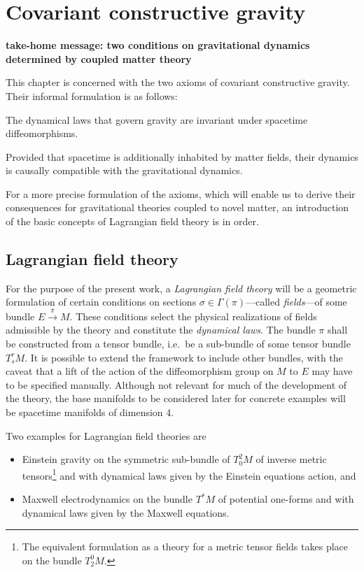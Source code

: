 \chapter{Covariant constructive gravity}

\textbf{take-home message: two conditions on gravitational dynamics determined by coupled matter theory}

This chapter is concerned with the two axioms of covariant constructive gravity. Their informal formulation is as follows:
\begin{axiom}
  The dynamical laws that govern gravity are invariant under spacetime diffeomorphisms. \cite{cgg paper}
\end{axiom}
\begin{axiom}
  Provided that spacetime is additionally inhabited by matter fields, their dynamics is causally compatible with the gravitational dynamics. \cite{cgg paper}
\end{axiom}

For a more precise formulation of the axioms, which will enable us to derive their consequences for gravitational theories coupled to novel matter, an introduction of the basic concepts of Lagrangian field theory is in order.

\section{Lagrangian field theory}
For the purpose of the present work, a \emph{Lagrangian field theory} will be a geometric formulation of certain conditions on sections $\sigma\in\Gamma(\pi)$---called \emph{fields}---of some bundle $E\overset{\pi}{\longrightarrow} M$. These conditions select the physical realizations of fields admissible by the theory and constitute the \emph{dynamical laws}. The bundle $\pi$ shall be constructed from a tensor bundle, i.e.~be a sub-bundle of some tensor bundle $T^r_sM$. It is possible to extend the framework to include other bundles, with the caveat that a lift of the action of the diffeomorphism group on $M$ to $E$ may have to be specified manually. Although not relevant for much of the development of the theory, the base manifolds to be considered later for concrete examples will be spacetime manifolds of dimension 4.

\begin{example}
  Two examples for Lagrangian field theories are
  \begin{itemize}
    \item Einstein gravity on the symmetric sub-bundle of $T^2_0M$ of inverse metric tensors\footnote{The equivalent formulation as a theory for a metric tensor fields takes place on the bundle $T^0_2M$.} and with dynamical laws given by the Einstein equations action, and
    \item Maxwell electrodynamics on the bundle $T^\ast M$ of potential one-forms and with dynamical laws given by the Maxwell equations.
  \end{itemize}
\end{example}

